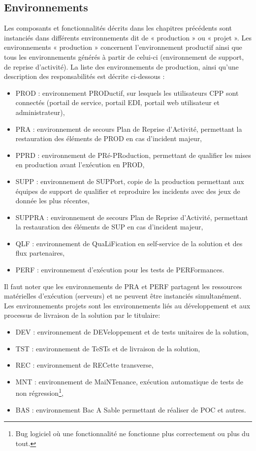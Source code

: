 \documentclass[12pt,a4paper]{article}
\begin{document}
\subsection{Environnements}
Les composants et fonctionnalités décrits dans les chapitres précédents sont instanciés dans différents environnements dit de « production » ou « projet ». Les environnements « production » concernent l’environnement productif ainsi que tous les environnements générés à partir de celui-ci (environnement de support, de reprise d’activité).
\smallbreak
La liste des environnements de production, ainsi qu’une description des responsabilités est décrite ci-dessous :
\smallbreak
\begin{itemize}
\item	PROD : environnement PRODuctif, sur lesquels les utilisateurs CPP sont connectés (portail de service, portail EDI, portail web utilisateur et administrateur),
\item	PRA : environnement de secours Plan de Reprise d’Activité, permettant la restauration des éléments de PROD en cas d’incident majeur,
\item	PPRD : environnement de PRé-PRoduction, permettant de qualifier les mises en production avant l'exécution en PROD,
\item	SUPP : environnement de SUPPort, copie de la production permettant aux équipes de support de qualifier et reproduire les incidents avec des jeux de donnée les plus récentes,
\item	SUPPRA : environnement de secours Plan de Reprise d’Activité, permettant la restauration des éléments de SUP en cas d’incident majeur,
\item	QLF : environnement de QuaLiFication en self-service de la solution et des flux partenaires,
\item	PERF : environnement d’exécution pour les tests de PERFormances.
\end{itemize}
\medbreak
Il faut noter que les  environnements de PRA et PERF partagent les ressources matérielles d'exécution (serveurs) et ne peuvent être instanciés simultanément.
Les environnements projets sont les environnements liés au développement et aux processus de livraison de la solution par le titulaire: 
\smallbreak
\begin{itemize}
\item	DEV : environnement de DEVeloppement et de tests unitaires de la solution,
\item	TST : environnement de TeSTs et de livraison de la solution,
\item	REC : environnement de RECette transverse,
\item	MNT : environnement de MaiNTenance, exécution automatique de tests de non régression\footnote{Bug logiciel où une fonctionnalité ne fonctionne plus correctement ou plus du tout.},
\item	BAS : environnement Bac A Sable permettant de réaliser de POC et autres.
\end{itemize}
\medbreak
\clearpage
\newpage
\end{document}
